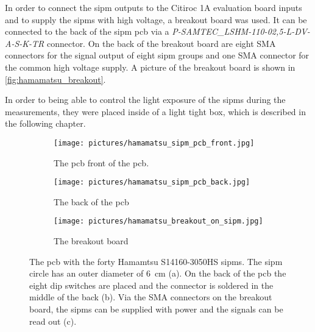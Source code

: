 In order to connect the \ac{sipm} outputs to the Citiroc 1A evaluation board inputs and to supply the \ac{sipm}s with high voltage, a breakout board was used.
It can be connected to the back of the \ac{sipm} \ac{pcb} via a \textit{P-SAMTEC\_LSHM-110-02,5-L-DV-A-S-K-TR} connector.
On the back of the breakout board are eight SMA connectors for the signal output of eight \ac{sipm} groups and one SMA connector for the common high voltage supply.
A picture of the breakout board is shown in \autoref{fig:hamamatsu_breakout}.



In order to being able to control the light exposure of the \ac{sipm}s during the measurements, they were placed inside of a light tight box, which is described in the following chapter.

\begin{figure}
    \centering
    \begin{subfigure}[t]{0.33\textwidth}
        \centering
        \texttt{[image: pictures/hamamatsu\_sipm\_pcb\_front.jpg]}
        \caption{The \ac{pcb} front of the \ac{pcb}.}
        \label{fig:hamamatsu_pcb_front}
    \end{subfigure}%
    \begin{subfigure}[t]{0.33\textwidth}
        \centering
        \texttt{[image: pictures/hamamatsu\_sipm\_pcb\_back.jpg]}
        \caption{The back of the \ac{pcb}}
    \end{subfigure}%
    \begin{subfigure}[t]{0.33\textwidth}
        \centering
        \texttt{[image: pictures/hamamatsu\_breakout\_on\_sipm.jpg]}
        \caption{The breakout board}
        \label{fig:hamamatsu_breakout}
    \end{subfigure}
	\caption[Hamamatsu \ac{sipm} array and the breakout board.]{The \ac{pcb} with the forty Hamamtsu S14160-3050HS \ac{sipm}s. 
	The \ac{sipm} circle has an outer diameter of \SI{6}{\centi\meter} (a). 
	On the back of the \ac{pcb} the eight dip switches are placed and the connector is soldered in the middle of the back (b). 
	Via the SMA connectors on the breakout board, the \ac{sipm}s can be supplied with power and the signals can be read out (c).}
\end{figure}





